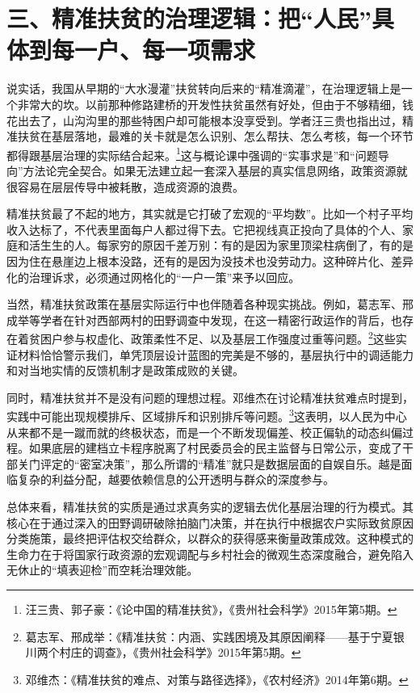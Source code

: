 \documentclass[12pt,a4paper]{ctexart}
\begin{document}
\section*{三、精准扶贫的治理逻辑：把“人民”具体到每一户、每一项需求}

说实话，我国从早期的“大水漫灌”扶贫转向后来的“精准滴灌”，在治理逻辑上是一个非常大的坎。以前那种修路建桥的开发性扶贫虽然有好处，但由于不够精细，钱花出去了，山沟沟里的那些特困户却可能根本没享受到。学者汪三贵也指出过，精准扶贫在基层落地，最难的关卡就是怎么识别、怎么帮扶、怎么考核，每一个环节都得跟基层治理的实际结合起来。\footnote{汪三贵、郭子豪：《论中国的精准扶贫》，《贵州社会科学》2015年第5期。}这与概论课中强调的“实事求是”和“问题导向”方法论完全契合。如果无法建立起一套深入基层的真实信息网络，政策资源就很容易在层层传导中被耗散，造成资源的浪费。

精准扶贫最了不起的地方，其实就是它打破了宏观的“平均数”。比如一个村子平均收入达标了，不代表里面每户人都过得下去。它把视线真正投向了具体的个人、家庭和活生生的人。每家穷的原因千差万别：有的是因为家里顶梁柱病倒了，有的是因为住在悬崖边上根本没路，还有的是因为没技术也没劳动力。这种碎片化、差异化的治理诉求，必须通过网格化的“一户一策”来予以回应。

当然，精准扶贫政策在基层实际运行中也伴随着各种现实挑战。例如，葛志军、邢成举等学者在针对西部两村的田野调查中发现，在这一精密行政运作的背后，也存在着贫困户参与权虚化、政策柔性不足、以及基层工作强度过重等问题。\footnote{葛志军、邢成举：《精准扶贫：内涵、实践困境及其原因阐释——基于宁夏银川两个村庄的调查》，《贵州社会科学》2015年第5期。}这些实证材料恰恰警示我们，单凭顶层设计蓝图的完美是不够的，基层执行中的调适能力和对当地实情的反馈机制才是政策成败的关键。

同时，精准扶贫并不是没有问题的理想过程。邓维杰在讨论精准扶贫难点时提到，实践中可能出现规模排斥、区域排斥和识别排斥等问题。\footnote{邓维杰：《精准扶贫的难点、对策与路径选择》，《农村经济》2014年第6期。}这表明，以人民为中心从来都不是一蹴而就的终极状态，而是一个不断发现偏差、校正偏轨的动态纠偏过程。如果底层的建档立卡程序脱离了村民委员会的民主监督与日常公示，变成了干部关门评定的“密室决策”，那么所谓的“精准”就只是数据层面的自娱自乐。越是面临复杂的利益分配，越要依赖信息的公开透明与群众的深度参与。

总体来看，精准扶贫的实质是通过求真务实的逻辑去优化基层治理的行为模式。其核心在于通过深入的田野调研破除拍脑门决策，并在执行中根据农户实际致贫原因分类施策，最终把评估权交给群众，以群众的获得感来衡量政策成效。这种模式的生命力在于将国家行政资源的宏观调配与乡村社会的微观生态深度融合，避免陷入无休止的“填表迎检”而空耗治理效能。
\end{document}
